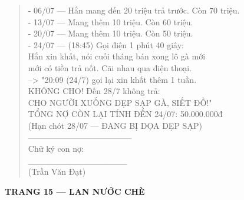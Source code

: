 \documentclass[12pt,a4paper]{article}
\begin{document}
\begin{quote}
- 06/07 --- Hắn mang đến 20 triệu trả trước. Còn 70 triệu.\\
- 13/07 --- Mang thêm 10 triệu. Còn 60 triệu.\\
- 20/07 --- Mang thêm 10 triệu. Còn 50 triệu.\\
- 24/07 --- (18:45) Gọi điện 1 phút 40 giây:\\
          Hắn xin khất, nói cuối tháng bán xong lô gà mới\\
          mới có tiền trả nốt. Cãi nhau qua điện thoại.\\
          --> "20:09 (24/7) gọi lại xin khất thêm 1 tuần.\\
               KHÔNG CHO! Đến 28/7 không trả:\\
               CHO NGƯỜI XUỐNG DẸP SẠP GÀ, SIẾT ĐỒ!"\\
\vspace{0.2cm}
TỔNG NỢ CÒN LẠI TÍNH ĐẾN 24/07: 50.000.000đ\\
(Hạn chót 28/07 --- ĐANG BỊ DỌA DẸP SẠP)\\
--------------------------------------\\
Chữ ký con nợ:\\
\vspace{0.2cm}
\_\_\_\_\_\_\_\_\_\_\_\_\_\_\_\_\\
(Trần Văn Đạt)\\
\end{quote}




\vspace{0.35cm}\noindent\textbf{\large TRANG 15 — LAN NƯỚC CHÈ}\\[0.15cm]
\end{document}
